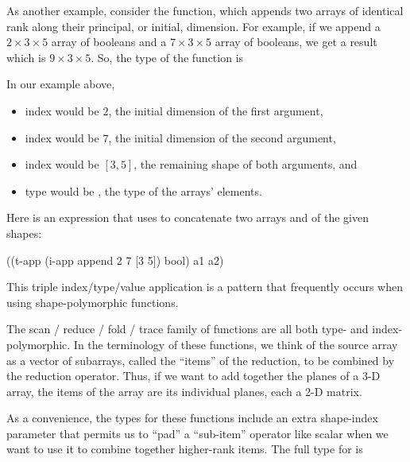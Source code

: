 As another example, consider the  function,
which appends two arrays of identical rank 
along their principal, or initial, dimension.
For example, if we append a $2 \times 3 \times 5$ array of booleans
and a $7 \times 3 \times 5$ array of booleans,
we get a result which is $9 \times 3 \times 5$.
So, the type of the  function is
\begin{code}
 \end{code}
In our example above,
\begin{itemize}
\item index  would be $2$, the initial dimension of the first argument,
\item index  would be $7$, the initial dimension of the second argument,
\item index  would be $[3, 5]$, the remaining shape of both arguments, and
\item type  would be , the type of the arrays' elements.
\end{itemize}
%
Here is an expression that uses  to concatenate two arrays
 and  of the given shapes:
\begin{code}
((t-app (i-app append 2 7 [3 5])
        bool)
 a1 a2)\end{code}
This triple index/type/value application is
a pattern that frequently occurs when using shape-polymorphic functions.


The scan / reduce / fold / trace family of functions are
all both type- and index-polymorphic.
In the terminology of these functions, 
we think of the source array as a vector of subarrays,
called the ``items'' of the reduction,
to be combined by the reduction operator.
Thus, if we want to add together the planes of a 3-D array,
the items of the array are its individual planes,
each a 2-D matrix.

As a convenience, 
the types for these functions include an extra shape-index parameter
that permits us to ``pad'' a ``sub-item'' operator like scalar \ex{+} 
when we want to use it to combine together higher-rank items.
The full type for  is
\begin{code}
\end{code}

